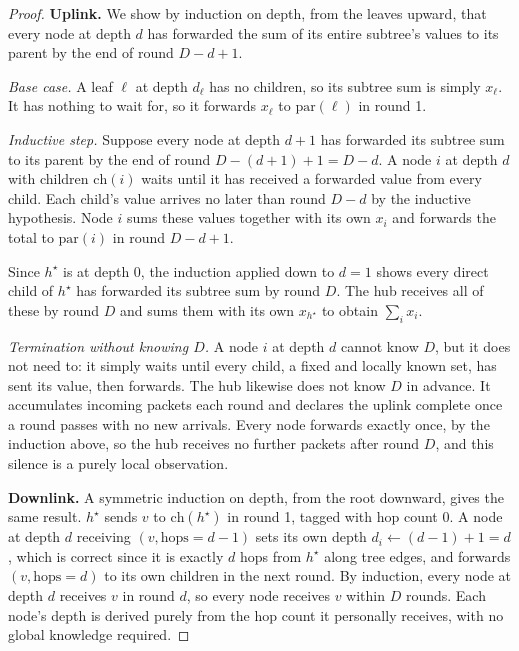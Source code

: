 \documentclass[letterpaper]{article} %
\begin{document}
\begin{proof}
\textbf{Uplink.} We show by induction on depth, from the leaves upward,
that every node at depth $d$ has forwarded the sum of its entire subtree's
values to its parent by the end of round $D-d+1$.

\emph{Base case.} A leaf $\ell$ at depth $d_\ell$ has no children, so its
subtree sum is simply $x_\ell$. It has nothing to wait for, so it forwards
$x_\ell$ to $\mathrm{par}(\ell)$ in round 1.

\emph{Inductive step.} Suppose every node at depth $d+1$ has forwarded its
subtree sum to its parent by the end of round $D-(d+1)+1 = D-d$. A node $i$
at depth $d$ with children $\mathrm{ch}(i)$ waits until it has received a
forwarded value from every child. Each child's value arrives no later than
round $D-d$ by the inductive hypothesis. Node $i$ sums these values
together with its own $x_i$ and forwards the total to $\mathrm{par}(i)$ in
round $D-d+1$.

Since $h^\star$ is at depth 0, the induction applied down to $d=1$ shows
every direct child of $h^\star$ has forwarded its subtree sum by round $D$.
The hub receives all of these by round $D$ and sums them with its own
$x_{h^\star}$ to obtain $\sum_i x_i$.

\emph{Termination without knowing $D$.} A node $i$ at depth $d$ cannot know
$D$, but it does not need to: it simply waits until every child, a fixed
and locally known set, has sent its value, then forwards. The hub likewise
does not know $D$ in advance. It accumulates incoming packets each round
and declares the uplink complete once a round passes with no new arrivals.
Every node forwards exactly once, by the induction above, so the hub
receives no further packets after round $D$, and this silence is a purely
local observation.

\textbf{Downlink.} A symmetric induction on depth, from the root downward,
gives the same result. $h^\star$ sends $v$ to $\mathrm{ch}(h^\star)$ in
round 1, tagged with hop count $0$. A node at depth $d$ receiving $(v,
\mathrm{hops}=d-1)$ sets its own depth $d_i \leftarrow (d-1)+1 = d$, which
is correct since it is exactly $d$ hops from $h^\star$ along tree edges,
and forwards $(v, \mathrm{hops}=d)$ to its own children in the next round.
By induction, every node at depth $d$ receives $v$ in round $d$, so every
node receives $v$ within $D$ rounds. Each node's depth is derived purely
from the hop count it personally receives, with no global knowledge
required.
\end{proof}
\end{document}
